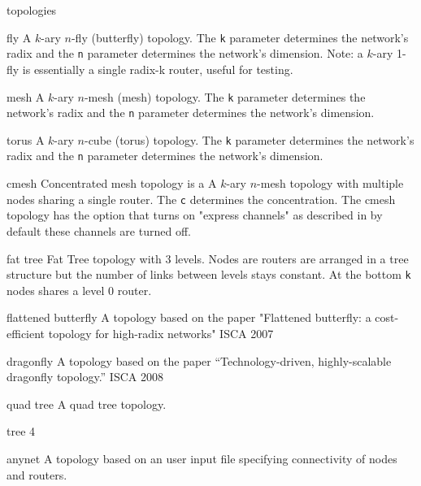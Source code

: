 \documentclass[11pt]{article}
\begin{document}
\begin{opt_list}{topologies}
\item[fly] A $k$-ary $n$-fly (butterfly) topology. The \texttt{k}
parameter determines the network's radix and the \texttt{n} parameter
determines the network's dimension. Note: a $k$-ary 1-fly is
essentially a single radix-k router, useful for testing.

\item[mesh] A $k$-ary $n$-mesh (mesh) topology. The \texttt{k}
parameter determines the network's radix and the \texttt{n} parameter determines
the network's dimension.


\item[torus] A $k$-ary $n$-cube (torus) topology.  The \texttt{k}
parameter determines the network's radix and the \texttt{n} parameter determines
the network's dimension.
\item[cmesh] Concentrated mesh topology is a A $k$-ary $n$-mesh
  topology with multiple nodes sharing a single router. The \texttt{c}
  determines the concentration. The cmesh topology has the option that
  turns on "express channels" as described in  by default these
  channels are turned off.  

\item[fat tree] Fat Tree topology with 3 levels. Nodes are routers are
  arranged in a tree structure but the number of links between levels
  stays constant. At the bottom \texttt{k} nodes shares a level 0
  router. 

\item[flattened butterfly] A topology based on the paper "Flattened
  butterfly: a cost-efficient topology for high-radix networks" ISCA
  2007 

\item[dragonfly] A topology based on the paper ``Technology-driven,
  highly-scalable dragonfly topology.'' ISCA 2008

\item[quad tree] A quad tree topology.

\item[tree 4]

\item[anynet] A topology based on an user input file specifying
  connectivity of nodes and routers. 

\end{opt_list}

\end{document}
